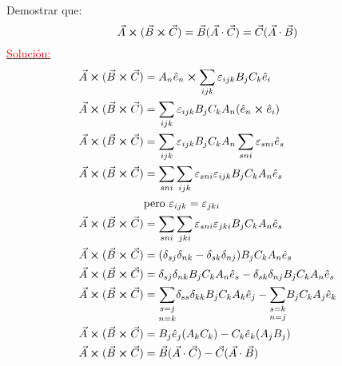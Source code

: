 \documentclass[../main]{subfiles}
\begin{document}
\begin{problema}{Demostrar que:}
    $$\vec{A}\cross(\vec{B}\cross \vec{C})=\vec{B}(\vec{A}\cdot \vec{C})=\vec{C} (\vec{A}\cdot \vec{B})$$
    \underline{\textcolor{red}{Solución:}} \\
    \begin{align*}
        \vec{A}\cross(\vec{B}\cross \vec{C})&=A_n \hat{e}_n \cross \sum_{ijk} \varepsilon_{ijk} B_j C_k \hat{e}_i \\
        \vec{A}\cross(\vec{B}\cross \vec{C})&=\sum_{ijk} \varepsilon_{ijk} B_j C_k A_n(\hat{e}_n \cross \hat{e}_i) \\
        \vec{A}\cross(\vec{B}\cross \vec{C})&=\sum_{ijk} \varepsilon_{ijk} B_j C_k A_n \sum_{sni} \varepsilon_{sni} \hat{e}_s \\
        \vec{A}\cross(\vec{B}\cross \vec{C})&=\sum_{sni} \sum_{ijk} \varepsilon_{sni} \varepsilon_{ijk} B_j C_k A_n \hat{e}_s \\
        & \text{pero} \ \varepsilon_{ijk}=\varepsilon_{jki} \\
        \vec{A}\cross(\vec{B}\cross \vec{C})&=\sum_{sni} \sum_{jki} \varepsilon_{sni} \varepsilon_{jki} B_j C_k A_n \hat{e}_s \\
        \vec{A}\cross(\vec{B}\cross \vec{C})&=(\delta_{sj}\delta_{nk}-\delta_{sk}\delta_{nj}) B_j C_k A_n \hat{e}_s \\
        \vec{A}\cross(\vec{B}\cross \vec{C})&=\delta_{sj} \delta_{nk} B_j C_k A_n \hat{e}_s-\delta_{sk}\delta_{nj} B_j C_k A_n \hat{e}_s \\
        \vec{A}\cross(\vec{B}\cross \vec{C})&=\underset{n=k}{\sum_{s=j}} \delta_{ss}\delta_{kk} B_j C_k A_k \hat{e}_j-\underset{n=j}{\sum_{s=k}} B_j C_k A_j \hat{e}_k \\
        \vec{A}\cross(\vec{B}\cross \vec{C})&=B_j \hat{e}_j (A_k C_k)- C_k \hat{e}_k(A_j B_j) \\
        \vec{A}\cross(\vec{B}\cross \vec{C})&=\vec{B}(\vec{A}\cdot\vec{C})-\vec{C}(\vec{A}\cdot\vec{B})
    \end{align*}
\end{problema}
\end{document}
